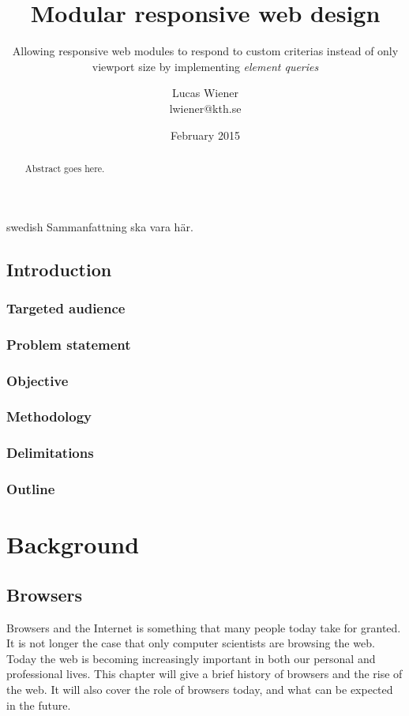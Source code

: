\documentclass[a4paper,11pt]{kth-mag}
\title{Modular responsive web design}
\subtitle{Allowing responsive web modules to respond to custom criterias instead of only viewport size by implementing \emph{element queries}}
\author{Lucas Wiener \\ \lowercase{lwiener@kth.se}}
\date{February 2015}
\begin{document}
  \frontmatter
  \pagestyle{empty}
  \removepagenumbers
  \maketitle
  \begin{abstract}
    Abstract goes here.
  \end{abstract}
  \clearpage
  \begin{foreignabstract}{swedish}
    Sammanfattning ska vara här.
  \end{foreignabstract}
  \clearpage
  \tableofcontents*
  \mainmatter
  \pagestyle{newchap}
  \chapter{Introduction}
    \section{Targeted audience}
    \section{Problem statement}
    \section{Objective}
    \section{Methodology}
    \section{Delimitations}
    \section{Outline}
  \part{Background}

    \chapter{Browsers} 
      Browsers and the Internet is something that many people today take for granted.
      It is not longer the case that only computer scientists are browsing the web.
      Today the web is becoming increasingly important in both our personal and professional lives.
      This chapter will give a brief history of browsers and the rise of the web.
      It will also cover the role of browsers today, and what can be expected in the future.
\end{document}
